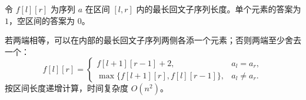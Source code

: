 令 $f[l][r]$ 为序列 $a$ 在区间 $[l,r]$ 内的最长回文子序列长度。单个元素的答案为 $1$，空区间的答案为 $0$。

若两端相等，可以在内部的最长回文子序列两侧各添一个元素；否则两端至少舍去一个：
\[
f[l][r]=\begin{cases}
f[l+1][r-1]+2,&a_l=a_r,\\
\max\{f[l+1][r],f[l][r-1]\},&a_l\ne a_r.
\end{cases}
\]
按区间长度递增计算，时间复杂度 $O(n^2)$。
